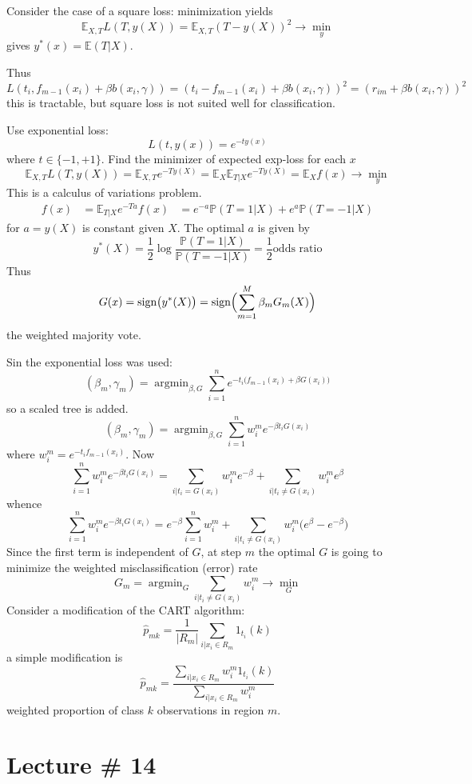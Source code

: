 \documentclass[a4paper]{article}
\newcommand{\ex}{\mathbb{E}}
\newcommand{\pr}[0]{{\mathbb{P}}}
\newcommand{\argmin}{\mathop{\text{argmin}}}
\begin{document}
Consider the case of a square loss: minimization yields
\[ \ex_{X,T} L(T, y(X)) = \ex_{X,T} (T - y(X))^2 \to \min_y \]
gives $y^*(x) = \ex(T|X)$.

Thus
\[
L(t_i,f_{m-1}(x_i) + \beta b(x_i, \gamma))
= (t_i - f_{m-1}(x_i) + \beta b(x_i, \gamma))^2
= (r_{im} + \beta b(x_i, \gamma))^2
\]
this is tractable, but square loss is not suited well for classification.

Use exponential loss:
\[L(t,y(x)) = e^{-t y(x)} \]
where $t\in\{-1,+1\}$. 
Find the minimizer of expected exp-loss for each $x$
\[
\ex_{X,T} L(T, y(X))
= \ex_{X,T} e^{ - T y(X)}
= \ex_X \ex_{T|X} e^{ - T y(X)}
= \ex_X f(x)
\to \min_y
\]
This is a calculus of variations problem.
\begin{align*}
	f(x) &= \ex_{T|X} e^{ - T a }
	f(x) &= e^{ - a } \pr(T=1|X) + e^{ a } \pr(T=-1|X)
\end{align*}
for $a=y(X)$ is constant given $X$. The optimal $a$ is given by
\[
y^*(X)
= \frac{1}{2} \log\frac{\pr(T=1|X)}{\pr(T=-1|X)}
= \frac{1}{2} \text{odds ratio}
\]
Thus
\[
G(x)
= \text{sign} \bigl( y^*(X)\bigr)
= \text{sign} \Bigl( \sum_{m=1}^M \beta_m G_m(X) \Bigr)
\]
the weighted majority vote.

Sin the exponential loss was used:
\[
(\beta_m, \gamma_m) 
= \argmin_{\beta, G} \sum_{i=1}^n e^{-t_i\bigl(f_{m-1}(x_i) + \beta G(x_i) \bigr)}
\]
so a scaled tree is added.
\[
(\beta_m, \gamma_m)
= \argmin_{\beta, G} \sum_{i=1}^n w^m_i e^{- \beta t_i G(x_i)}
\]
where $w^m_i = e^{-t_i f_{m-1}(x_i)}$. Now
\[
\sum_{i=1}^n w^m_i e^{- \beta t_i G(x_i)}
= \sum_{i| t_i = G(x_i)} w^m_i e^{- \beta} 
+ \sum_{i| t_i \neq G(x_i)} w^m_i e^\beta
\]
whence
\[
\sum_{i=1}^n w^m_i e^{- \beta t_i G(x_i)}
= e^{- \beta} \sum_{i=1}^n w^m_i
+ \sum_{i| t_i \neq G(x_i)} w^m_i \bigl( e^\beta - e^{- \beta} \bigr)
\]
Since the first term is independent of $G$, at step $m$ the optimal $G$ is
going to minimize the weighted misclassification (error) rate
\[
G_m = \argmin_G \sum_{i| t_i \neq G(x_i)} w^m_i \to \min_G
\]
Consider a modification of the CART algorithm:
\[\hat{p}_{mk} = \frac{1}{|R_m|} \sum_{i|x_i\in R_m} 1_{t_i}(k)\]
a simple modification is
\[\hat{p}_{mk} = \frac{ \sum_{i|x_i\in R_m} w^m_i 1_{t_i}(k) }{ \sum_{i|x_i\in R_m} w^m_i }\]
weighted proportion of class $k$ observations in region $m$.




\section{Lecture \# 14} %
\label{sec:lecture_14}
\end{document}
